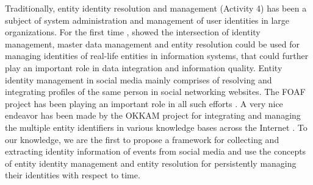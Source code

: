 Traditionally, entity identity resolution and management (Activity 4) has been a subject of system administration and management of user identities in large organizations. For the first time \cite{zhou2011entity}, showed the intersection of identity management, master data management and entity resolution could be used for managing identities of real-life entities in information systems, that could further play an important role in data integration and information quality. Entity identity management in social media mainly comprises of resolving and integrating profiles of the same person in social networking websites. The FOAF project has been playing an important role in all such efforts \cite{bouquet2010entity,bortoli2007foaf,raad2010user}. A very nice endeavor has been made by the OKKAM project for integrating and managing the multiple entity identifiers in various knowledge bases across the Internet \cite{bouquet2006okkam}. To our knowledge, we are the first to propose a framework for collecting and extracting identity information of events from social media and use the concepts of entity identity management and entity resolution for persistently managing their identities with respect to time.

